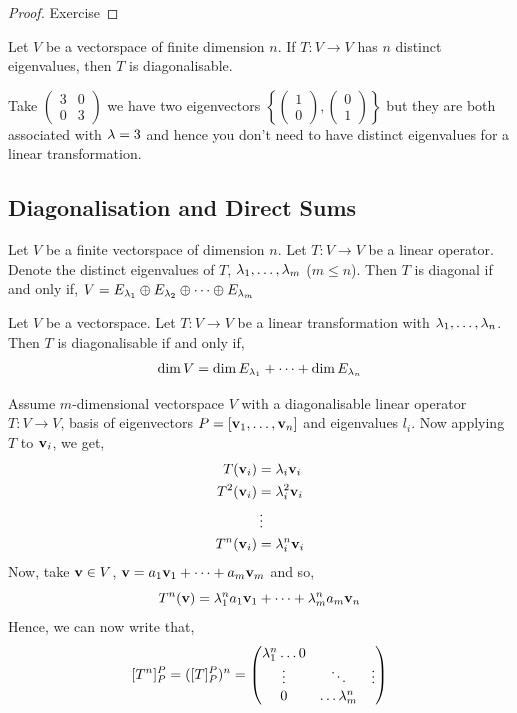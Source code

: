 \documentclass{article}
\begin{document}
\begin{proof}
  Exercise
\end{proof}

\begin{ncor}
  Let $V$ be a vectorspace of finite dimension $n$. If $T: V \to V$ has $n$ distinct eigenvalues, then $T$ is diagonalisable.
\end{ncor}

\begin{remark}
  Take $\displaystyle{\begin{pmatrix}
    3 & 0 \\ 0 & 3
  \end{pmatrix}}$ we have two eigenvectors $\left \{ \begin{pmatrix}
    1 \\ 0
  \end{pmatrix}, \begin{pmatrix}
    0 \\ 1
  \end{pmatrix} \right \}$ but they are both associated with $\lambda = 3$ and hence you don't need to have distinct eigenvalues for a linear transformation.
\end{remark}

\subsection{Diagonalisation and Direct Sums}
\begin{ncor}
  Let $V$ be a finite vectorspace of dimension $n$. Let $T : V \to V$ be a linear operator. Denote the distinct eigenvalues of $T$, $\lambda_1, \dots, \lambda_m$ ($m \le n$). Then $T$ is diagonal if and only if,
  $V = E_{\lambda_1} \oplus E_{\lambda_2} \oplus \dots \oplus E_{\lambda_m}$
\end{ncor}

\begin{ncor}
  Let $V$ be a vectorspace. Let $T: V \to V$ be a linear transformation with $\lambda_1, \dots, \lambda_n$. Then $T$ is diagonalisable if and only if,
  $$ \dim V = \dim E_{\lambda_1} + \dots + \dim E_{\lambda_n} $$
\end{ncor}

Assume $m$-dimensional vectorspace $V$ with a diagonalisable linear operator $T : V \to V$, basis of eigenvectors $P = [\boldsymbol{\mathbf{v}}_1, \dots, \boldsymbol{\mathbf{v}}_n]$ and eigenvalues $l_i$. Now applying $T$ to $\boldsymbol{\mathbf{v}}_i$, we get,
\begin{align*}
  T(\boldsymbol{\mathbf{v}}_i) &= \lambda_i\boldsymbol{\mathbf{v}}_i\\
  T^2(\boldsymbol{\mathbf{v}}_i) &= \lambda_i^2\boldsymbol{\mathbf{v}}_i\\
  &\vdots\\
  T^n(\boldsymbol{\mathbf{v}}_i) &= \lambda_i^n\boldsymbol{\mathbf{v}}_i
\end{align*}
Now, take $\boldsymbol{\mathbf{v}} \in V$, $\boldsymbol{\mathbf{v}} = a_1\boldsymbol{\mathbf{v}}_1 + \dots + a_m\boldsymbol{\mathbf{v}}_m$ and so,
$$ T^n(\boldsymbol{\mathbf{v}}) = \lambda_1^na_1\boldsymbol{\mathbf{v}}_1 + \dots + \lambda_m^na_m\boldsymbol{\mathbf{v}}_n $$
Hence, we can now write that,
$$ [T^n]_P^P = ([T]_P^P)^n = \begin{pmatrix}
  \lambda_1^n \dots 0\\
  \vdots & \ddots & \vdots \\
  0 & \dots \lambda_m^n
\end{pmatrix} $$
\end{document}
